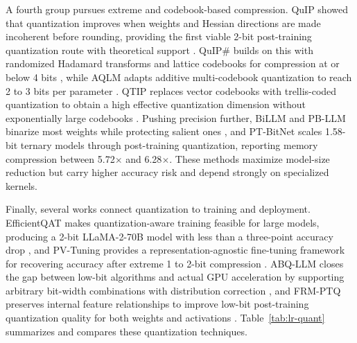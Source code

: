 A fourth group pursues extreme and codebook-based compression. QuIP showed that quantization improves when weights and Hessian directions are made incoherent before rounding, providing the first viable 2-bit post-training quantization route with theoretical support \cite{chee2023quip}. QuIP\# builds on this with randomized Hadamard transforms and lattice codebooks for compression at or below 4 bits \cite{tseng2024quipsharp}, while AQLM adapts additive multi-codebook quantization to reach 2 to 3 bits per parameter \cite{egiazarian2024aqlm}. QTIP replaces vector codebooks with trellis-coded quantization to obtain a high effective quantization dimension without exponentially large codebooks \cite{tseng2024qtip}. Pushing precision further, BiLLM and PB-LLM binarize most weights while protecting salient ones \cite{huang2024billm,shang2023pbllm}, and PT-BitNet scales 1.58-bit ternary models through post-training quantization, reporting memory compression between 5.72$\times$ and 6.28$\times$\cite{survey2025ptbitnet}. These methods maximize model-size reduction but carry higher accuracy risk and depend strongly on specialized kernels.

Finally, several works connect quantization to training and deployment. EfficientQAT makes quantization-aware training feasible for large models, producing a 2-bit LLaMA-2-70B model with less than a three-point accuracy drop \cite{chen2025efficientqat}, and PV-Tuning provides a representation-agnostic fine-tuning framework for recovering accuracy after extreme 1 to 2-bit compression \cite{malinovskii2024pvtuning}. ABQ-LLM closes the gap between low-bit algorithms and actual GPU acceleration by supporting arbitrary bit-width combinations with distribution correction \cite{zeng2025abqllm}, and FRM-PTQ preserves internal feature relationships to improve low-bit post-training quantization quality for both weights and activations \cite{survey2026frmptq}. Table~\ref{tab:lr-quant} summarizes and compares these quantization techniques.

